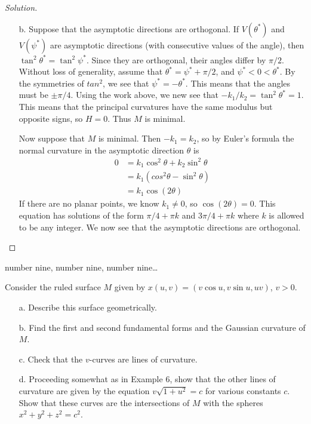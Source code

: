 \documentclass[Shifrin_Solutions_Spring_2015]{subfiles}
\begin{document}
\begin{proof}[Solution]
\begin{itemize}
\item[b.] Suppose that the asymptotic directions are orthogonal. If $V(\theta^\ast)$ and $V(\psi^\ast)$ are asymptotic directions (with consecutive values of the angle), then $\tan^2\theta^\ast = \tan^2\psi^\ast$. Since they are orthogonal, their angles differ by $\pi/2$. Without loss of generality, assume that $\theta^\ast = \psi^\ast + \pi/2$, and $\psi^\ast < 0 < \theta^\ast$. By the symmetries of $tan^2$, we see that $\psi^\ast = - \theta^\ast$. This means that the angles must be $\pm \pi/4$. Using the work above, we new see that $-k_1/k_2 = \tan^2\theta^\ast = 1$. This means that the principal curvatures have the same modulus but opposite signs, so $H=0$. Thus $M$ is minimal.

Now suppose that $M$ is minimal. Then $-k_1=k_2$, so by Euler's formula the normal curvature in the asymptotic direction $\theta$ is
\[
\begin{split}
0 & = k_1 \cos^2\theta + k_2 \sin^2\theta \\
	& = k_1 \left( cos^2\theta - \sin^2\theta \right) \\
	& = k_1 \cos(2\theta)
\end{split}
\]
If there are no planar points, we know $k_1 \neq 0$, so $\cos(2\theta) = 0$. This equation has solutions of the form $\pi/4 + \pi k$ and $3\pi/4 + \pi k$ where $k$ is allowed to be any integer. We now see that the asymptotic directions are orthogonal.
\end{itemize}
\end{proof}

\begin{exercise}
number nine, number nine, number nine\dots
\end{exercise}

\begin{exercise}
Consider the ruled surface $M$ given by $x(u,v) = \left( v\cos u, v\sin u , uv \right)$, $v>0$.
\begin{itemize}
\item[a.] Describe this surface geometrically.
\item[b.] Find the first and second fundamental forms and the Gaussian curvature of $M$.
\item[c.] Check that the $v$-curves are lines of curvature.
\item[d.] Proceeding somewhat as in Example 6, show that the other lines of curvature are given by the equation $v\sqrt{1+u^2}= c$ for various constants $c$. Show that these curves are the intersections of $M$ with the spheres $x^2+y^2+z^2 = c^2$.
\end{itemize}
\end{exercise}
\end{document}
